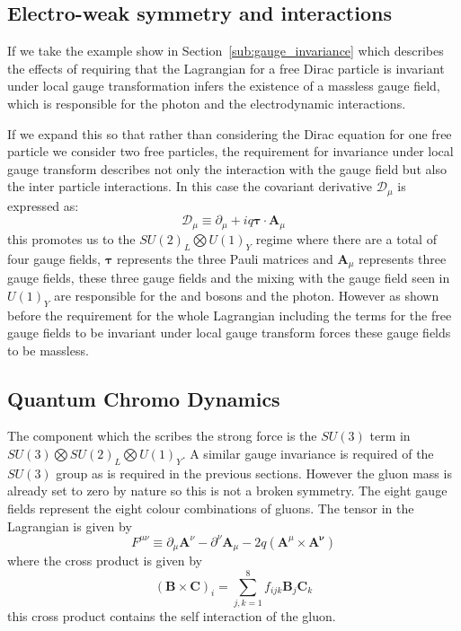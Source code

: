 \subsection{Electro-weak symmetry and interactions} %
\label{sub:electro_weak_symmetry_and_interactions}
If we take the example show in Section~\ref{sub:gauge_invariance} which 
describes the effects of requiring that the Lagrangian for a free Dirac 
particle is invariant under local gauge transformation infers the existence of 
a massless gauge field, which is responsible for the photon and the 
electrodynamic interactions.

If we expand this so that rather than considering the Dirac equation for one 
free particle we consider two free particles, the requirement for invariance 
under local gauge transform describes not only the interaction with the gauge 
field but also the inter particle interactions. In this case the covariant 
derivative $\mathcal{D}_{\mu}$ is expressed as:
\begin{equation}
  \mathcal{D}_{\mu}\equiv \partial_{\mu} + iq \bm{\tau}\cdot\bm{A}_{\mu}
\end{equation}
this promotes us to the $SU(2)_{L} \bigotimes U(1)_{Y}$ regime where there are 
a total of four gauge fields, $\bm{\tau}$ represents the three Pauli matrices 
and $\bm{A}_{\mu}$ represents three gauge fields, these three gauge fields and 
the mixing with the gauge field seen in $U(1)_{Y}$ are responsible for the \PW 
and \PZ bosons and the photon. However as shown before the requirement for the 
whole Lagrangian including the terms for the free gauge fields to be invariant 
under local gauge transform forces these gauge fields to be massless.


\subsection{Quantum Chromo Dynamics} %
\label{sub:quantum_chromo_dynamics}
The component which the scribes the strong force is the $SU(3)$ term in 
$SU(3)\bigotimes SU(2)_{L} \bigotimes U(1)_{Y}$. A similar gauge invariance is 
required of the $SU(3)$ group as is required in the previous sections. However 
the gluon mass is already set to zero by nature so this is not a broken 
symmetry. The eight gauge fields represent the eight colour combinations of 
gluons. The tensor in the Lagrangian is given by
\begin{equation}
  F^{\mu\nu} \equiv \partial_{\mu}\bm{A}^{\nu} - \partial^{\nu}\bm{A}_{\mu} - 2q\left(\bm{A}^{\mu}\times\bm{A^{\nu}}\right)
\end{equation}
where the cross product is given by
\begin{equation}
  \left(\bm{B}\times\bm{C}\right)_{i} = \sum^{8}_{j,k=1}f_{ijk}\bm{B}_{j}\bm{C}_{k}
\end{equation}
this cross product contains the self interaction of the gluon.





